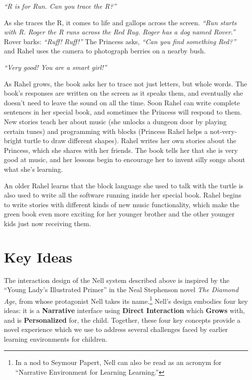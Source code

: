 \documentclass[preprint]{sig-alternate}
\begin{document}
\textit{``R is for Run.  Can you trace the R?''}

As she traces the R, it comes to life and gallops across the screen.
\textit{``Run starts with R.  Roger the R runs across the Red Rug.
Roger has a dog named Rover.''}  Rover barks: \textit{``Ruff! Ruff!''}  The
Princess asks, \textit{``Can you find something Red?''} and Rahel uses the
camera to photograph berries on a nearby bush.

\textit{``Very good!  You are a smart girl!''}

As Rahel grows, the book asks her to trace not just letters, but whole
words.  The book's responses are written on the screen as it speaks
them, and eventually she doesn't need to leave the sound on all the
time.  Soon Rahel can write complete sentences in her special book,
and sometimes the Princess will respond to them.  New stories teach her about
music (she unlocks a dungeon door by playing certain tunes) and
programming with blocks (Princess Rahel helps a not-very-bright turtle
to draw different shapes).  Rahel writes her own stories about the Princess,
which she shares with her friends.  The book tells her that she is
very good at music, and her lessons begin to encourage her to invent
silly songs about what she's learning.

An older Rahel learns that the block language she used to talk with
the turtle is also used to write all the software running inside
her special book.  Rahel begins to write stories with different
kinds of new music functionality, which make the green book even more
exciting for her younger brother and the other younger kids just now
receiving them.

\section{Key Ideas}
The interaction design of the Nell system described above is inspired
by the ``Young Lady's Illustrated Primer'' in the Neal Stephenson
novel \textit{The Diamond Age}, from whose protagonist Nell takes its
name.\footnote{In a nod to Seymour Papert, Nell can also be read as an
acronym for ``Narrative Environment for Learning Learning.''}
Nell's design embodies four key ideas: it is a \textbf{Narrative}
interface using \textbf{Direct Interaction} which \textbf{Grows} with,
and is \textbf{Personalized} for, the child.
Together, these four key concepts provide a novel
experience which we use to address several challenges faced by earlier
learning environments for children.
\end{document}
